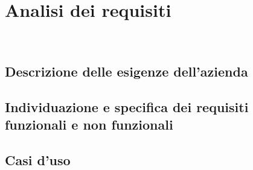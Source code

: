 \chapter{Analisi dei requisiti}
\\
\label{cap:analisi-requisiti}
\section{Descrizione delle esigenze dell'azienda}

\section{Individuazione e specifica dei requisiti funzionali e non funzionali}

\section{Casi d'uso}
